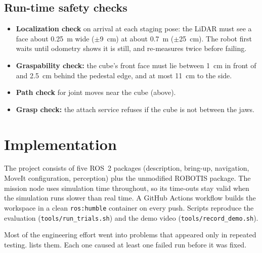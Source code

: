 \documentclass[journal]{IEEEtran}
\begin{document}
\subsection{Run-time safety checks}
\label{sec:checks}
\begin{itemize}
  \item \textbf{Localization check} on arrival at each staging pose: the LiDAR must see a face about \SI{0.25}{m} wide ($\pm$\SI{9}{cm}) at about \SI{0.7}{m} ($\pm$\SI{25}{cm}). The robot first waits until odometry shows it is still, and re-measures twice before failing.
  \item \textbf{Graspability check:} the cube's front face must lie between \SI{1}{cm} in front of and \SI{2.5}{cm} behind the pedestal edge, and at most \SI{11}{cm} to the side.
  \item \textbf{Path check} for joint moves near the cube (above).
  \item \textbf{Grasp check:} the attach service refuses if the cube is not between the jaws.
\end{itemize}

\section{Implementation}
\label{sec:problems}

The project consists of five ROS~2 packages (description, bring-up, navigation, MoveIt configuration, perception) plus the unmodified ROBOTIS package. The mission node uses simulation time throughout, so its time-outs stay valid when the simulation runs slower than real time. A GitHub Actions workflow builds the workspace in a clean \texttt{ros:humble} container on every push. Scripts reproduce the evaluation (\texttt{tools/run\_trials.sh}) and the demo video (\texttt{tools/record\_demo.sh}).

Most of the engineering effort went into problems that appeared only in repeated testing.  lists them. Each one caused at least one failed run before it was fixed.
\end{document}
